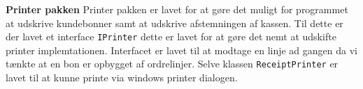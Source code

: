 \textbf{Printer pakken}
\newline
Printer pakken er lavet for at gøre det muligt for programmet at udskrive kundebonner samt at udskrive afstemningen af kassen.
Til dette er der lavet et interface \texttt{IPrinter} dette er lavet for at gøre det nemt at udskifte printer implemtationen.
Interfacet er lavet til at modtage en linje ad gangen da vi tænkte at en bon er opbygget af ordrelinjer.
Selve klassen \texttt{ReceiptPrinter} er lavet til at kunne printe via windows printer dialogen.  

